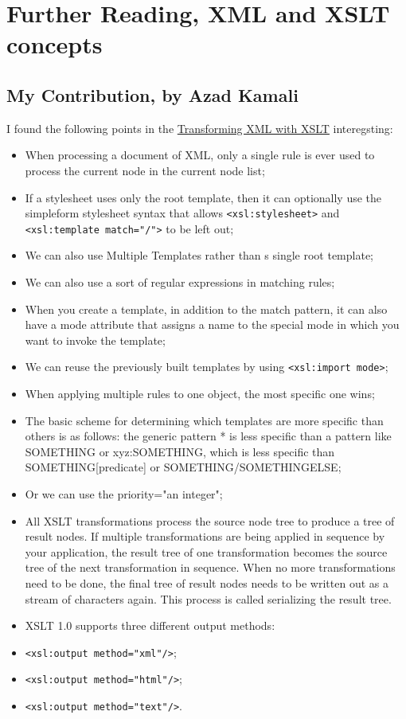 
%
\section{Further Reading, XML and XSLT concepts}
\label{sect:azad}
\subsection{My Contribution, by Azad Kamali}
	I found the following points in the \href{http://oreilly.com/catalog/orxmlapp/chapter/ch07.pdf}{Transforming XML with XSLT} interegsting:
        \begin{itemize}
		\item When processing a document of XML, only a single rule is ever used to process the current node in the current node list;
		\item If a stylesheet uses only the root template, then it can optionally use the simpleform stylesheet syntax that allows \verb~<xsl:stylesheet>~ and \verb~<xsl:template match="/">~ to be left out;
		\item We can also use Multiple Templates rather than s single root template;
		\item We can also use a sort of regular expressions in matching rules;
		\item When you create a template, in addition to the match pattern, it can also have a mode attribute that assigns a name to the special mode in which you want to invoke the template;
    \item We can reuse the previously built templates by using \verb~<xsl:import mode>~;
		\item When applying multiple rules to one object, the most specific one wins;
		\item The basic scheme for determining which templates are more specific than others is as follows: the generic pattern * is less specific than a pattern like SOMETHING or xyz:SOMETHING, which is less specific than SOMETHING[predicate] or SOMETHING/SOMETHINGELSE;
		\item Or we can use the priority="an integer";
		\item All XSLT transformations process the source node tree to produce a tree of result nodes. If multiple transformations are being applied in sequence by your application, the result tree of one transformation becomes the source tree of the next transformation in sequence. When no more transformations need to be done, the final tree of result nodes needs to be written out as a stream of characters again. This process is called serializing the result tree.
		\item XSLT 1.0 supports three different output methods:
		\item  \verb~<xsl:output method="xml"/>~;
		\item \verb~<xsl:output method="html"/>~;
		\item \verb~<xsl:output method="text"/>~.
        \end{itemize}
